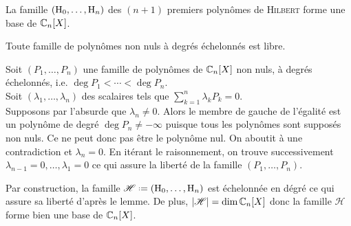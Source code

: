 \begin{prop}
    La famille $(\mathrm{H}_0, \dots, \mathrm{H}_n)$ des $(n+1)$ premiers polynômes de \textsc{Hilbert} forme une base de $\mathbb{C}_n[X]$.
\end{prop}

\begin{lemme} 
    Toute famille de polynômes non nuls à degrés échelonnés est libre.
\end{lemme}

\begin{preuve}
    Soit $(P_1, \dots, P_n)$ une famille de polynômes de $\mathbb{C}_n[X]$ non nuls, à degrés échelonnés, i.e. $\deg P_1 < \cdots < \deg P_n$. \\
    Soit $(\lambda_1, \dots, \lambda_n)$ des scalaires tels que  $\sum\limits_{k=1}^n \lambda_k P_k = 0$. \\
    Supposons par l'absurde que $\lambda_n \not= 0$. Alors le membre de gauche de l'égalité est un polynôme de degré $\deg P_n \not= - \infty$ puisque tous les polynômes sont supposés non nuls. Ce ne peut donc pas être le polynôme nul. On aboutit à une contradiction et $\lambda_n = 0$. En itérant le raisonnement, on trouve successivement $\lambda_{n-1} = 0, \dots, \lambda_1 = 0$ ce qui assure la liberté de la famille $(P_1, \dots, P_n)$.
\end{preuve}

\begin{preuve}
    Par construction, la famille $\mathscr{H} \defeq (\Hilb_0, \dots, \Hilb_n)$ est échelonnée en dégré \note ce qui assure sa liberté d'après le lemme. De plus, $|\mathscr{H}| = \dim \mathbb{C}_n[X]$ donc la famille $\mathscr{H}$ forme bien une base de $\mathbb{C}_n[X]$.
\end{preuve}